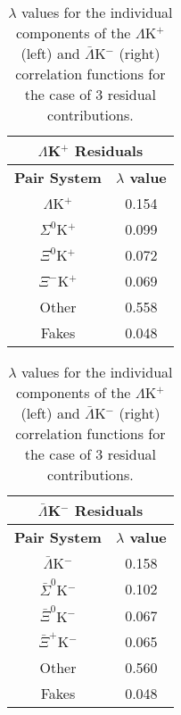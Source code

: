 \documentclass[ALICE,manyauthors]{cernphprep}
\begin{document}
\clearpage
\begin{table}[htbp]
 \centering
 \begin{minipage}{0.3\textwidth}
  \centering
  \begin{tabular}{|c|c|}
   \multicolumn{2}{c}{$\Lambda$K$^{+}$ Residuals} \\
   \hline
   \textbf{Pair System} & \textbf{$\lambda$ value} \\
   \hline
   $\Lambda$K$^{+}$ & 0.154 \\
   $\Sigma^{0}$K$^{+}$ & 0.099 \\
   $\Xi^{0}$K$^{+}$ & 0.072 \\
   $\Xi^{-}$K$^{+}$ & 0.069 \\
   Other & 0.558 \\
   Fakes & 0.048 \\
   \hline
  \end{tabular}
 \end{minipage}
 \begin{minipage}{0.3\textwidth}
  \centering
  \begin{tabular}{|c|c|}
   \multicolumn{2}{c}{$\bar{\Lambda}$K$^{-}$ Residuals} \\
   \hline
   \textbf{Pair System} & \textbf{$\lambda$ value} \\
   \hline
   $\bar{\Lambda}$K$^{-}$ & 0.158 \\
   $\bar{\Sigma}^{0}$K$^{-}$ & 0.102 \\
   $\bar{\Xi}^{0}$K$^{-}$ & 0.067 \\
   $\bar{\Xi}^{+}$K$^{-}$ & 0.065 \\
   Other & 0.560 \\
   Fakes & 0.048 \\
   \hline
  \end{tabular}
 \end{minipage}  
 \caption{$\lambda$ values for the individual components of the $\Lambda$K$^{+}$ (left) and $\bar{\Lambda}$K$^{-}$ (right) correlation functions for the case of 3 residual contributions.}
 \label{tab:LambdaValues_3Res_LamKchP}
\end{table}
\end{document}
